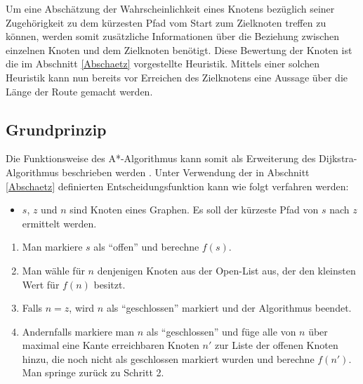	
	
	Um eine Abschätzung der Wahrscheinlichkeit eines Knotens bezüglich seiner Zugehörigkeit zu dem  kürzesten Pfad vom Start zum Zielknoten treffen zu können, werden somit zusätzliche Informationen über die Beziehung zwischen einzelnen Knoten und dem Zielknoten benötigt. Diese Bewertung der Knoten ist die im Abschnitt \ref{Abschaetz} vorgestellte Heuristik. Mittels einer solchen Heuristik kann nun bereits vor Erreichen des Zielknotens eine Aussage über die Länge der Route gemacht werden. 
	
	\subsection{Grundprinzip}
		\label{A*-Alg}
		Die Funktionsweise des A*-Algorithmus kann somit als Erweiterung des Dijkstra-Algorithmus beschrieben werden \cite{Hart1968}. Unter Verwendung der in Abschnitt \ref{Abschaetz} definierten Entscheidungsfunktion kann wie folgt verfahren werden:
		
		\begin{itemize}
			 \item 	$s$, $z$ und $n$ sind Knoten eines Graphen. Es soll der kürzeste Pfad von $s$ nach $z$ ermittelt werden. 
			
		\end{itemize}
		
		\begin{center}
			
			\begin{minipage}{0.8\linewidth}
				
				
				\begin{enumerate}
					\item Man markiere $s$ als "`offen"' und berechne $f(s)$.
					\item Man wähle für $n$ denjenigen Knoten aus der Open-List aus, der den  kleinsten Wert für $f(n)$ besitzt.
					\item Falls $n=z$, wird $n$ als "`geschlossen"' markiert und der Algorithmus beendet.
					\item Andernfalls markiere man $n$ als "`geschlossen"' und füge alle von $n$ über maximal eine Kante erreichbaren Knoten $n'$ zur Liste der offenen Knoten hinzu, die noch nicht als geschlossen markiert wurden und berechne $f(n')$. 	Man springe zurück zu Schritt 2.
				\end{enumerate}
			\end{minipage}
		\end{center}
		
